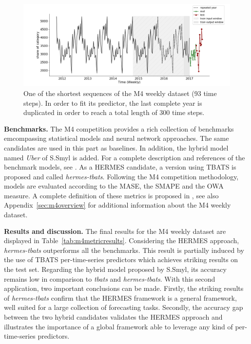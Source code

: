 \documentclass[lettersize,journal]{IEEEtran}
\begin{document}
\begin{figure}
  \centering
    \includegraphics[width=1.\linewidth]{figure/M4_dataset}
  \caption{One of the shortest sequences of the M4 weekly dataset (93 time steps). In order to fit its predictor, the last complete year is duplicated in order to reach a total length of 300 time steps.}
\label{fig:m4dataset}
\end{figure}

\textbf{Benchmarks. } The M4 competition provides a rich collection of benchmarks emcompassing statistical models and neural network approaches. The same candidates are used in this part as baselines. In addition, the hybrid model named \textit{Uber} of S.Smyl is added. For a complete description and references of the benchmark models, see \cite{makridakis2020m4}. As a HERMES candidate, a version using TBATS is proposed and called \textit{hermes-tbats}. Following the M4 competition methodology, models are evaluated according to the MASE, the SMAPE and the OWA measure. A complete definition of these metrics is proposed in \cite{makridakis2020m4}, see also Appendix~\ref{sec:m4overview} for additional information about the M4 weekly dataset.

\textbf{Results and discussion. } The final results for the M4 weekly dataset are displayed in Table~\ref{tab:m4metricresults}. Considering the HERMES approach, \textit{hermes-tbats} outperforms all the benchmarks. This result is partially induced by the use of TBATS per-time-series predictors which achieves striking results on the test set. Regarding the hybrid model proposed by S.Smyl, its accuracy remains low in comparison to \textit{tbats} and  \textit{hermes-tbats}. With this second application, two important conclusions can be made. Firstly, the striking results of \textit{hermes-tbats} confirm that the HERMES framework is a general framework, well suited for a large collection of forecasting tasks. Secondly, the accuracy gap between the two hybrid candidates validates the HERMES approach and illustrates the importance of a global framework able to leverage any kind of per-time-series predictors.
\end{document}
